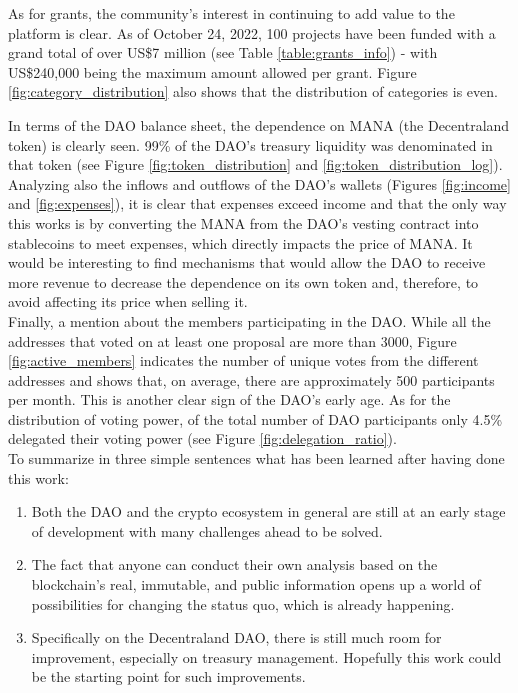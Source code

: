 \documentclass[MSE,Master,english]{twbook}%
\begin{document}
As for grants, the community's interest in continuing to add value to the platform is clear. As of October 24, 2022, 100 projects have been funded with a grand total of over US\$7 million (see Table \ref{table:grants_info}) - with US\$240,000 being the maximum amount allowed per grant. Figure \ref{fig:category_distribution} also shows that the distribution of categories is even.

In terms of the DAO balance sheet, the dependence on MANA (the Decentraland token) is clearly seen. 99\% of the DAO's treasury liquidity was denominated in that token (see Figure \ref{fig:token_distribution} and \ref{fig:token_distribution_log}). Analyzing also the inflows and outflows of the DAO's wallets (Figures \ref{fig:income} and \ref{fig:expenses}), it is clear that expenses exceed income and that the only way this works is by converting the MANA from the DAO's vesting contract into stablecoins to meet expenses, which directly impacts the price of MANA. It would be interesting to find mechanisms that would allow the DAO to receive more revenue to decrease the dependence on its own token and, therefore, to avoid affecting its price when selling it. \\

Finally, a mention about the members participating in the DAO. While all the addresses that voted on at least one proposal are more than 3000, Figure \ref{fig:active_members} indicates the number of unique votes from the different addresses and shows that, on average, there are approximately 500 participants per month. This is another clear sign of the DAO's early age. As for the distribution of voting power, of the total number of DAO participants only 4.5\% delegated their voting power (see Figure \ref{fig:delegation_ratio}). \\

To summarize in three simple sentences what has been learned after having done this work:

\begin{enumerate}
  \item Both the DAO and the crypto ecosystem in general are still at an early stage of development with many challenges ahead to be solved.
  \item The fact that anyone can conduct their own analysis based on the blockchain's real, immutable, and public information opens up a world of possibilities for changing the status quo, which is already happening.
  \item Specifically on the Decentraland DAO, there is still much room for improvement, especially on treasury management. Hopefully this work could be the starting point for such improvements.
\end{enumerate}
\end{document}
